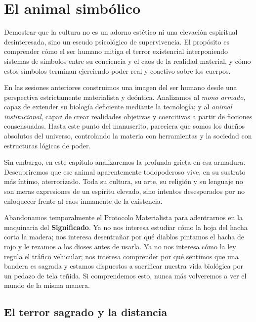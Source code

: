 \chapter{El animal simbólico}
\label{cap:animal_simbolico}

\begin{objetivo}
Demostrar que la cultura no es un adorno estético ni una elevación espiritual desinteresada, sino un escudo psicológico de supervivencia. El propósito es comprender cómo el ser humano mitiga el terror existencial interponiendo sistemas de símbolos entre su conciencia y el caos de la realidad material, y cómo estos símbolos terminan ejerciendo poder real y coactivo sobre los cuerpos.
\end{objetivo}

En las sesiones anteriores construimos una imagen del ser humano desde una perspectiva estrictamente materialista y deóntica. Analizamos al \textit{mono armado}, capaz de extender su biología deficiente mediante la tecnología; y al \textit{animal institucional}, capaz de crear realidades objetivas y coercitivas a partir de ficciones consensuadas. Hasta este punto del manuscrito, pareciera que somos los dueños absolutos del universo, controlando la materia con herramientas y la sociedad con estructuras lógicas de poder.

Sin embargo, en este capítulo analizaremos la profunda grieta en esa armadura. Descubriremos que ese animal aparentemente todopoderoso vive, en su sustrato más íntimo, aterrorizado. Toda su cultura, su arte, su religión y su lenguaje no son meras expresiones de un espíritu elevado, sino intentos desesperados por no enloquecer frente al caos inmanente de la existencia. 

Abandonamos temporalmente el Protocolo Materialista para adentrarnos en la maquinaria del \textbf{Significado}. Ya no nos interesa estudiar cómo la hoja del hacha corta la madera; nos interesa desentrañar por qué diablos pintamos el hacha de rojo y le rezamos a los dioses antes de usarla. Ya no nos interesa cómo la ley regula el tráfico vehicular; nos interesa comprender por qué sentimos que una bandera es sagrada y estamos dispuestos a sacrificar nuestra vida biológica por un pedazo de tela teñida. Si comprendemos esto, nunca más volveremos a ver el mundo de la misma manera.

\section{El terror sagrado y la distancia}

